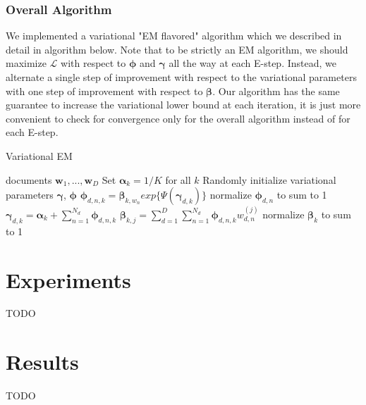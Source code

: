 \documentclass{article}
\begin{document}
\subsubsection{Overall Algorithm}

We implemented a variational "EM flavored" algorithm which we described in detail in algorithm below. Note that to be strictly an EM algorithm, we should maximize $\mathcal{L}$ with respect to $\bm{\phi}$ and $\bm{\gamma}$ all the way at each E-step. Instead, we alternate a single step of improvement with respect to the variational parameters with one step of improvement with respect to $\bm{\beta}$. Our algorithm has the same guarantee to increase the variational lower bound at each iteration, it is just more convenient to check for convergence only for the overall algorithm instead of for each E-step.

\begin{algorithm}[tb]
   \caption{Variational EM}
   \label{algo}
\begin{algorithmic}
    documents $\mathbf{w}_1,...,\mathbf{w}_D$
   \STATE Set $\bm{\alpha}_k = 1 / K$ for all $k$ 
   \STATE Randomly initialize variational parameters $\bm{\gamma}$, $\bm{\phi}$ 
   \REPEAT
  	\STATE $\bm{\phi}_{d,n,k} = \bm{\beta}_{k, w_n} exp\{\Psi(\bm{\gamma}_{d,k})\}$
  	\ENDFOR
  	\STATE normalize $\bm{\phi}_{d,n}$ to sum to 1
  	\STATE $\bm{\gamma}_{d,k} = \bm{\alpha}_k + \sum_{n=1}^{N_d} \bm{\phi}_{d,n,k}$
   \ENDFOR
   \ENDFOR
   \STATE $\bm{\beta}_{k,j} = \sum_{d=1}^D \sum_{n=1}^{N_d} \bm{\phi}_{d, n, k} w_{d,n}^{(j)}$
   \ENDFOR
   \STATE normalize $\bm{\beta}_k$ to sum to 1
   \ENDFOR
   \STATE 
\end{algorithmic}
\end{algorithm}

\section{Experiments}
TODO

\section{Results}
TODO

\nocite{langley00}



\end{document}
